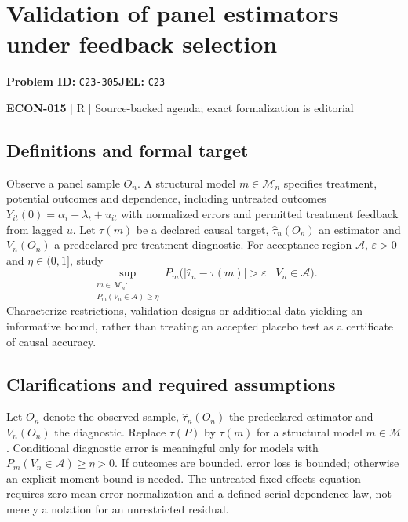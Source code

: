 \documentclass[11pt,a4paper]{article}
\begin{document}
\section*{Validation of panel estimators under feedback selection}
\textbf{Problem ID:} \texttt{C23-305}\quad \textbf{JEL:} \texttt{C23}\par
\label{problem:OP-0600}


\label{audited:ECON-015}

{\sffamily\small\color{muted}\textbf{ECON-015} | R | Source-backed agenda; exact formalization is editorial\par}

\subsection*{Definitions and formal target}

Observe a panel sample \(O_n\). A structural model \(m\in\mathcal M_n\) specifies treatment, potential outcomes and dependence, including untreated outcomes \(Y_{it}(0)=\alpha_i+\lambda_t+u_{it}\) with normalized errors and permitted treatment feedback from lagged \(u\). Let \(\tau(m)\) be a declared causal target, \(\widehat\tau_n(O_n)\) an estimator and \(V_n(O_n)\) a predeclared pre-treatment diagnostic. For acceptance region \(\mathcal A\), \(\varepsilon>0\) and \(\eta\in(0,1]\), study
\[
 \sup_{\substack{m\in\mathcal M_n:\\P_m(V_n\in\mathcal A)\geq\eta}}
 P_m\bigl(|\widehat\tau_n-\tau(m)|>\varepsilon\mid V_n\in\mathcal A\bigr).
\]
Characterize restrictions, validation designs or additional data yielding an informative bound, rather than treating an accepted placebo test as a certificate of causal accuracy.

\subsection*{Clarifications and required assumptions}

Let $O_n$ denote the observed sample, $\widehat\tau_n(O_n)$ the predeclared estimator and $V_n(O_n)$ the diagnostic. Replace $\tau(P)$ by $\tau(m)$ for a structural model $m\in\mathcal M$. Conditional diagnostic error is meaningful only for models with $P_m(V_n\in\mathcal A)\geq\eta>0$. If outcomes are bounded, error loss is bounded; otherwise an explicit moment bound is needed. The untreated fixed-effects equation requires zero-mean error normalization and a defined serial-dependence law, not merely a notation for an unrestricted residual.
\end{document}
